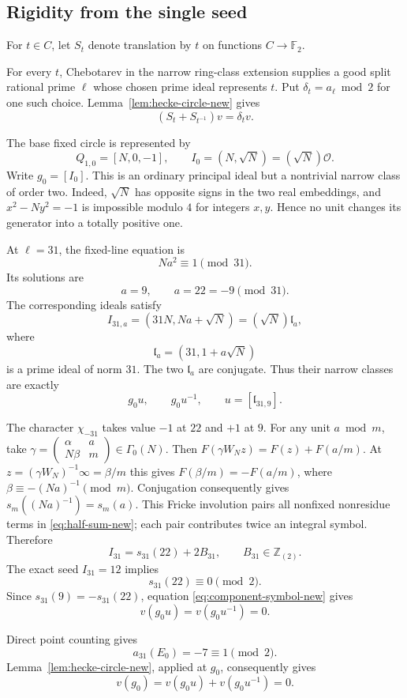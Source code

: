\documentclass[11pt]{article}
\begin{document}
\subsection{Rigidity from the single seed}

For $t\in C$, let $S_t$ denote translation
by $t$ on functions $C\to\mathbb F_2$.

For every $t$, Chebotarev in the narrow
ring-class extension supplies a good split
rational prime $\ell$ whose chosen prime
ideal represents $t$. Put
$\delta_t=a_\ell\bmod2$ for one such choice.
Lemma~\ref{lem:hecke-circle-new} gives
\[
(S_t+S_{t^{-1}})v=\delta_t v.
\]

The base fixed circle is represented by
\[
Q_{1,0}=[N,0,-1],\qquad
I_0=(N,\sqrt N)=(\sqrt N)\mathcal O.
\]
Write $g_0=[I_0]$.
This is an ordinary principal ideal but
a nontrivial narrow class of order two.
Indeed, $\sqrt N$ has opposite signs in
the two real embeddings, and
$x^2-Ny^2=-1$ is impossible modulo $4$
for integers $x,y$.
Hence no unit changes its generator into
a totally positive one.

At $\ell=31$, the fixed-line equation is
\[
Na^2\equiv1\pmod{31}.
\]
Its solutions are
\[
a=9,\qquad a=22=-9\pmod{31}.
\]
The corresponding ideals satisfy
\[
I_{31,a}=(31N,Na+\sqrt N)
=(\sqrt N)\mathfrak l_a,
\]
where
\[
\mathfrak l_a=(31,1+a\sqrt N)
\]
is a prime ideal of norm $31$.
The two $\mathfrak l_a$ are conjugate.
Thus their narrow classes are exactly
\[
g_0u,\qquad g_0u^{-1},
\qquad u=[\mathfrak l_{31,9}].
\]

The character $\chi_{-31}$ takes value
$-1$ at $22$ and $+1$ at $9$.
For any unit $a\bmod m$, take
$\gamma=\left(\begin{smallmatrix}\alpha&a\\N\beta&m\end{smallmatrix}\right)
\in\Gamma_0(N)$. Then
$F(\gamma W_Nz)=F(z)+F(a/m)$.
At $z=(\gamma W_N)^{-1}\infty=\beta/m$ this gives
$F(\beta/m)=-F(a/m)$, where $\beta\equiv-(Na)^{-1}\pmod m$.
Conjugation consequently gives $s_m((Na)^{-1})=s_m(a)$.
This Fricke involution pairs
all nonfixed nonresidue terms in
\eqref{eq:half-sum-new}; each pair
contributes twice an integral symbol.
Therefore
\[
I_{31}=s_{31}(22)+2B_{31},
\qquad B_{31}\in\mathbb Z_{(2)}.
\]
The exact seed $I_{31}=12$ implies
\[
s_{31}(22)\equiv0\pmod2.
\]
Since $s_{31}(9)=-s_{31}(22)$,
equation \eqref{eq:component-symbol-new}
gives
\[
v(g_0u)=v(g_0u^{-1})=0.
\]

Direct point counting gives
\[
a_{31}(E_0)=-7\equiv1\pmod2.
\]
Lemma~\ref{lem:hecke-circle-new}, applied
at $g_0$, consequently gives
\[
v(g_0)=v(g_0u)+v(g_0u^{-1})=0.
\]
\end{document}
